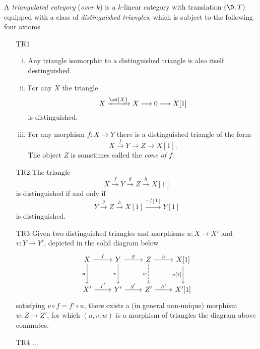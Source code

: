 \begin{definition}
    A \emph{triangulated category} (\emph{over $k$}) is a $k$-linear category with translation $(\D, T)$ equipped with a class of \emph{distinguished triangles}, which is subject to the following four axioms.
    \begin{enumerate}
        \item[\textup{TR1}] \begin{enumerate}[(i)]
            \item Any triangle isomorphic to a distinguished triangle is also itself destinguished.
            \item For any $X$ the triangle
            \[
                X \xrightarrow{\id{X}} X \longrightarrow 0 \longrightarrow X[1]
            \] 
            is distinguished.
            \item For any morphism $f \colon X \to Y$ there is a distinguished triangle of the form
            \[
                X \xrightarrow{\ f \ } Y \longrightarrow Z \longrightarrow X[1].
            \]
            The object $Z$ is sometimes called the \emph{cone of $f$}. 
            \end{enumerate}
        \item[TR2] The triangle
            \[
                X\xrightarrow{\ f \ } Y \xrightarrow{\ g \ } Z \xrightarrow{\ h \ } X[1]
            \]
            is distinguished if and only if
            \[
                Y \xrightarrow{\ g \ } Z \xrightarrow{\ h \ } X[1] \xrightarrow{-f[1]} Y[1]
            \]
            is distinguished.
        \item[TR3] Given two distinguished triangles and morphisms $u\colon X \to X'$ and $v\colon Y \to Y'$, depicted in the solid diagram below 
        \[
        \begin{tikzcd}[column sep = normal, row sep = 2.5em]
            X & Y & Z & {X[1]} \\
            {X'} & {Y'} & {Z'} & {X'[1]}
            \arrow["f", from=1-1, to=1-2]
            \arrow["u"', from=1-1, to=2-1]
            \arrow["g", from=1-2, to=1-3]
            \arrow["v"', from=1-2, to=2-2]
            \arrow["h", from=1-3, to=1-4]
            \arrow["w"', dashed, from=1-3, to=2-3]
            \arrow["{u[1]}"', from=1-4, to=2-4]
            \arrow["{f'}", from=2-1, to=2-2]
            \arrow["{g'}", from=2-2, to=2-3]
            \arrow["{h'}", from=2-3, to=2-4]
        \end{tikzcd}
        \]
        satisfying $v \circ f = f' \circ u$, there exists a (in general non-unique) morphism $w\colon Z \to Z'$, for which $(u, v, w)$ is a morphism of triangles \ie the diagram above commutes. 
        \item[TR4] ...
    \end{enumerate} 
\end{definition}

